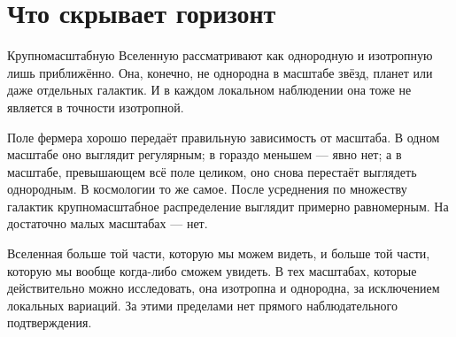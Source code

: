 \section{Что скрывает горизонт}

Крупномасштабную Вселенную рассматривают как однородную и изотропную лишь приближённо. Она, конечно, не однородна в масштабе звёзд, планет или даже отдельных галактик. И в каждом локальном наблюдении она тоже не является в точности изотропной.

Поле фермера хорошо передаёт правильную зависимость от масштаба. В одном масштабе оно выглядит регулярным; в гораздо меньшем — явно нет; а в масштабе, превышающем всё поле целиком, оно снова перестаёт выглядеть однородным. В космологии то же самое. После усреднения по множеству галактик крупномасштабное распределение выглядит примерно равномерным. На достаточно малых масштабах — нет.

Вселенная больше той части, которую мы можем видеть, и больше той части, которую мы вообще когда-либо сможем увидеть. В тех масштабах, которые действительно можно исследовать, она изотропна и однородна, за исключением локальных вариаций. За этими пределами нет прямого наблюдательного подтверждения.

\begin{classroomqa}
\end{classroomqa}

\begin{classroomqa}
\end{classroomqa}

